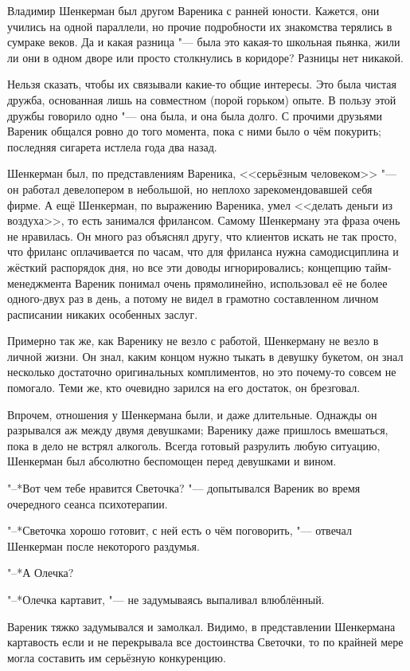Владимир Шенкерман был другом Вареника с ранней юности.
Кажется, они учились на одной параллели, но прочие подробности их знакомства терялись в сумраке веков.
Да и какая разница "--- была это какая-то школьная пьянка, жили ли они в одном дворе или просто столкнулись в коридоре?
Разницы нет никакой.

Нельзя сказать, чтобы их связывали какие-то общие интересы.
Это была чистая дружба, основанная лишь на совместном (порой горьком) опыте.
В пользу этой дружбы говорило одно "--- она была, и она была долго.
С прочими друзьями Вареник общался ровно до того момента, пока с ними было о чём покурить;
последняя сигарета истлела года два назад.

Шенкерман был, по представлениям Вареника, <<серьёзным человеком>> "--- он работал девелопером в небольшой, но неплохо зарекомендовавшей себя фирме.
А ещё Шенкерман, по выражению Вареника, умел <<делать деньги из воздуха>>, то есть занимался фрилансом.
Самому Шенкерману эта фраза очень не нравилась.
Он много раз объяснял другу, что клиентов искать не так просто, что фриланс оплачивается по часам, что для фриланса нужна самодисциплина и жёсткий распорядок дня, но все эти доводы игнорировались;
концепцию тайм-менеджмента Вареник понимал очень прямолинейно, использовал её не более одного-двух раз в день, а потому не видел в грамотно составленном личном расписании никаких особенных заслуг.

Примерно так же, как Варенику не везло с работой, Шенкерману не везло в личной жизни.
Он знал, каким концом нужно тыкать в девушку букетом, он знал несколько достаточно оригинальных комплиментов, но это почему-то совсем не помогало.
Теми же, кто очевидно зарился на его достаток, он брезговал.

Впрочем, отношения у Шенкермана были, и даже длительные.
Однажды он разрывался аж между двумя девушками;
Варенику даже пришлось вмешаться, пока в дело не встрял алкоголь.
Всегда готовый разрулить любую ситуацию, Шенкерман был абсолютно беспомощен перед девушками и вином.

"--*Вот чем тебе нравится Светочка? "--- допытывался Вареник во время очередного сеанса психотерапии.

"--*Светочка хорошо готовит, с ней есть о чём поговорить, "--- отвечал Шенкерман после некоторого раздумья.

"--*А Олечка?

"--*Олечка картавит, "--- не задумываясь выпаливал влюблённый.

Вареник тяжко задумывался и замолкал.
Видимо, в представлении Шенкермана картавость если и не перекрывала все достоинства Светочки, то по крайней мере могла составить им серьёзную конкуренцию.

